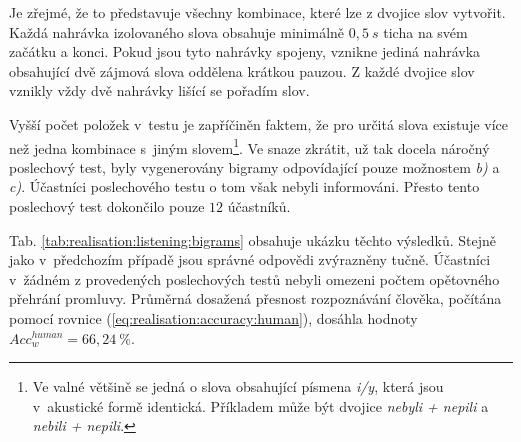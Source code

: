 \noindent Je zřejmé, že to představuje všechny kombinace, které lze z dvojice slov vytvořit.
Každá nahrávka izolovaného slova obsahuje minimálně $0,5\ s$ ticha na svém začátku a konci. Pokud jsou tyto nahrávky spojeny, vznikne jediná nahrávka obsahující dvě zájmová slova oddělena krátkou pauzou. Z každé dvojice slov vznikly vždy dvě nahrávky lišící se pořadím slov.

Vyšší počet položek v~testu je zapříčiněn faktem, že pro určitá slova existuje více než jedna kombinace s~jiným slovem\footnote{Ve valné většině se jedná o slova obsahující písmena \textit{i/y}, která jsou v~akustické formě identická. Příkladem může být dvojice \textit{nebyli + nepili} a \textit{nebili + nepili}.}. Ve snaze zkrátit, už tak docela náročný poslechový test, byly vygenerovány bigramy odpovídající pouze možnostem \textit{b)} a \textit{c)}. Účastníci poslechového testu o tom však nebyli informováni. Přesto tento poslechový test dokončilo pouze $12$ účastníků.

Tab. \ref{tab:realisation:listening:bigrams} obsahuje ukázku těchto výsledků.
Stejně jako v~předchozím případě jsou správné odpovědi zvýrazněny tučně.
Účastníci v~žádném z provedených poslechových testů nebyli omezeni počtem opětovného přehrání promluvy.
Průměrná dosažená přesnost rozpoznávání člověka, počítána pomocí rovnice (\ref{eq:realisation:accuracy:human}), dosáhla hodnoty $Acc_{w}^{human} = 66,24~\%$.

